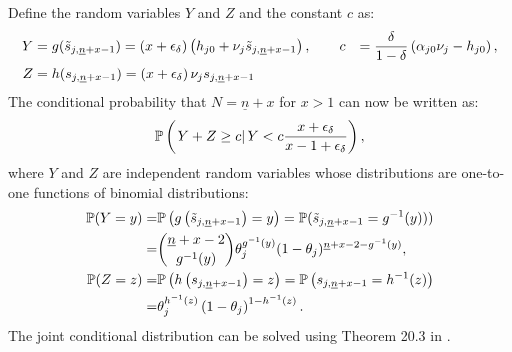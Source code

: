 Define the random variables $Y$ and $Z$ and the constant $c$ as:
\begin{alignat*}{2}
    Y &= g(\ks[, \underline{n} + x - 1])  =
        \pr{x + \epsilon_\delta}
        \pr{h_{j0} 
        + \nu_j \ks[, \underline{n} + x - 1]},
    \quad \quad
    c &= \frac{\delta}{1 - \delta} \pr{\alpha_{j0} \nu_j - h_{j0}},
    \\
    Z &= h(\pass_{j, \underline{n} + x - 1}) = \pr{x + \epsilon_\delta}
        \nu_j \pass_{j, \underline{n} + x - 1}
\end{alignat*}
The conditional probability that $N = \underline{n} + x$ for $x > 1$ can now be written as:
\begin{align*}
    \PP \pr{\cls{Y + Z \geq c}{Y < c \frac{x + \epsilon_\delta}{x - 1 + \epsilon_\delta}}},
\end{align*}
where $Y$ and $Z$ are independent random variables whose distributions are one-to-one functions of binomial distributions:
\begin{align*}
    \PP (Y = y) 
    =& \PP \pr{ g\pr{\ks[,\underline{n} + x - 1]}= y}
    = \PP (\ks[,\underline{n} + x - 1] = g^{-1} (y)))
    \\
    =&
    \binom{\underline{n} + x - 2}{g^{-1} (y)}
    \theta_j^{g^{-1} (y)}
    (1 - \theta_j)^{\underline{n} + x - 2 - g^{-1} (y)},
    \\
    \PP
    (Z = z)
    =& \PP \pr{ h\pr{\pass_{j, \underline{n} + x - 1}} = z}
    = \PP \pr{\pass_{j, \underline{n} + x - 1} = h^{-1} (z)}
    \\
    =&
    \theta_j^{h^{-1}(z)} \pr{1 - \theta_j}^{1 - h^{-1}(z)}.
\end{align*}
The joint conditional distribution can be solved using Theorem 20.3 in \textcite[pg. 280]{B61}.








